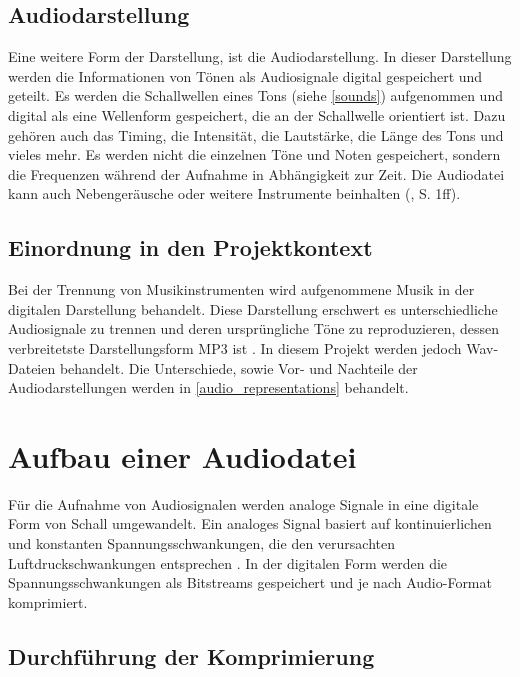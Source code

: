 \subsection{Audiodarstellung}

Eine weitere Form der Darstellung, ist die Audiodarstellung. In dieser Darstellung werden die Informationen von Tönen als Audiosignale digital gespeichert und geteilt. Es werden die Schallwellen eines Tons (siehe \cref{sounds}) aufgenommen und digital als eine Wellenform gespeichert, die an der Schallwelle orientiert ist. Dazu gehören auch das Timing, die Intensität, die Lautstärke, die Länge des Tons und vieles mehr. Es werden nicht die einzelnen Töne und Noten gespeichert, sondern die Frequenzen während der Aufnahme in Abhängigkeit zur Zeit. Die Audiodatei kann auch Nebengeräusche oder weitere Instrumente beinhalten (\cite{fundamentals_of_music_processing}, S. 1ff).

%
\subsection{Einordnung in den Projektkontext}
%

Bei der Trennung von Musikinstrumenten wird aufgenommene Musik in der digitalen Darstellung behandelt. Diese Darstellung erschwert es unterschiedliche Audiosignale zu trennen und deren ursprüngliche Töne zu reproduzieren, dessen verbreitetste Darstellungsform MP3 ist \parencite{mp3_most_popular}. In diesem Projekt werden jedoch Wav-Dateien behandelt. Die Unterschiede, sowie Vor- und Nachteile der Audiodarstellungen werden in \cref{audio_representations} behandelt.

%
\section{Aufbau einer Audiodatei}
%

Für die Aufnahme von Audiosignalen werden analoge Signale in eine digitale Form von Schall umgewandelt. Ein analoges Signal basiert auf kontinuierlichen und konstanten Spannungsschwankungen, die den verursachten Luftdruckschwankungen entsprechen \parencite{digital_representation}. In der digitalen Form werden die Spannungsschwankungen als Bitstreams gespeichert und je nach Audio-Format komprimiert.

%
\subsection{Durchführung der Komprimierung}
\label{compression}
%

